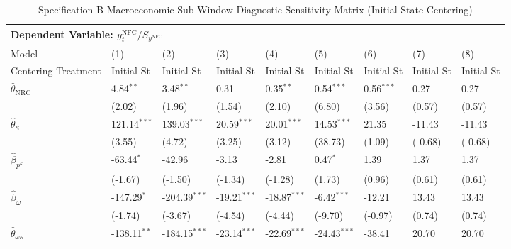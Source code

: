 \begin{landscape}
\begin{table}[H]
\centering
\caption{Specification B Macroeconomic Sub-Window Diagnostic Sensitivity Matrix (Initial-State Centering)}
\label{tab:specB_diagnostics}
\small
\begin{tabular}{p{5.0cm}p{1.5cm}p{1.5cm}p{1.5cm}p{1.5cm}p{1.5cm}p{1.5cm}p{1.5cm}p{1.5cm}}
\toprule
\multicolumn{9}{l}{\textbf{Dependent Variable: $y_t^{\text{NFC}} / S_{y^{\text{NFC}}}$}} \\
\midrule
Model & (1) & (2) & (3) & (4) & (5) & (6) & (7) & (8)  \\
Centering Treatment & Initial-St & Initial-St & Initial-St & Initial-St & Initial-St & Initial-St & Initial-St & Initial-St  \\
\midrule
$\hat{\theta}_{\text{NRC}}$ & 4.84$^{**}$ & 3.48$^{**}$ & 0.31 & 0.35$^{**}$ & 0.54$^{***}$ & 0.56$^{***}$ & 0.27 & 0.27  \\
 & {\scriptsize (2.02)} & {\scriptsize (1.96)} & {\scriptsize (1.54)} & {\scriptsize (2.10)} & {\scriptsize (6.80)} & {\scriptsize (3.56)} & {\scriptsize (0.57)} & {\scriptsize (0.57)}  \\
$\hat{\theta}_{\kappa}$ & 121.14$^{***}$ & 139.03$^{***}$ & 20.59$^{***}$ & 20.01$^{***}$ & 14.53$^{***}$ & 21.35 & -11.43 & -11.43  \\
 & {\scriptsize (3.55)} & {\scriptsize (4.72)} & {\scriptsize (3.25)} & {\scriptsize (3.12)} & {\scriptsize (38.73)} & {\scriptsize (1.09)} & {\scriptsize (-0.68)} & {\scriptsize (-0.68)}  \\
$\hat{\beta}_{p^{\kappa}}$ & -63.44$^{*}$ & -42.96 & -3.13 & -2.81 & 0.47$^{*}$ & 1.39 & 1.37 & 1.37  \\
 & {\scriptsize (-1.67)} & {\scriptsize (-1.50)} & {\scriptsize (-1.34)} & {\scriptsize (-1.28)} & {\scriptsize (1.73)} & {\scriptsize (0.96)} & {\scriptsize (0.61)} & {\scriptsize (0.61)}  \\
$\hat{\beta}_{\omega}$ & -147.29$^{*}$ & -204.39$^{***}$ & -19.21$^{***}$ & -18.87$^{***}$ & -6.42$^{***}$ & -12.21 & 13.43 & 13.43  \\
 & {\scriptsize (-1.74)} & {\scriptsize (-3.67)} & {\scriptsize (-4.54)} & {\scriptsize (-4.44)} & {\scriptsize (-9.70)} & {\scriptsize (-0.97)} & {\scriptsize (0.74)} & {\scriptsize (0.74)}  \\
$\hat{\theta}_{\omega \kappa}$ & -138.11$^{**}$ & -184.15$^{***}$ & -23.14$^{***}$ & -22.69$^{***}$ & -24.43$^{***}$ & -38.41 & 20.70 & 20.70  \\

\end{tabular}
\end{table}
\end{landscape}
